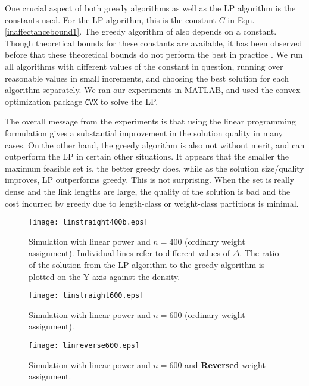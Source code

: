 \documentclass[11pt]{amsart}
\begin{document}
One crucial aspect of both greedy algorithms as well as the LP algorithm is the constants used. For the LP algorithm, this is the constant $C$ in Eqn. \ref{inaffectancebound1}. The greedy algorithm of \cite{SODA11} also depends on a constant.
Though theoretical bounds for these constants are available, it has been observed before that these theoretical
bounds do not perform the best in practice \cite{infocom11}. We run all algorithms with different values of the constant in question, running over reasonable values in small increments, and choosing the best solution for each algorithm separately.
We ran our experiments in MATLAB, and used the convex optimization package  \texttt{CVX} \cite{cvx} to solve the LP.

The overall message from the experiments is that using the linear
programming formulation gives a substantial improvement in the
solution quality in many cases. 
On the other hand, the greedy algorithm is also not without merit, and can outperform the LP in certain other situations.
It appears that the smaller the maximum feasible set is, the better
greedy does, while as the solution size/quality improves, LP
outperforms greedy. This is not surprising. When the set is really
dense and the link lengths are large, the quality of the solution is
bad and the cost incurred by greedy due to length-class or
weight-class partitions is minimal. 

\begin{figure}
\begin{center}
\texttt{[image: linstraight400b.eps]}
\caption{Simulation with linear power and $n = 400$ (ordinary weight assignment). Individual lines refer to different values of $\Delta$. The ratio of the solution from the LP algorithm to the greedy algorithm is plotted on the Y-axis against the density.} 
\label{fig:linstraight400}
\end{center}
\end{figure}

\begin{figure}
\begin{center}
\texttt{[image: linstraight600.eps]}
\caption{Simulation with linear power and $n = 600$ (ordinary weight assignment). } 
\label{fig:linstraight600}
\end{center}
\end{figure}

\begin{figure}
\begin{center}
\texttt{[image: linreverse600.eps]}
\caption{Simulation with linear power and $n = 600$ and {\bf Reversed} weight assignment. } 
\label{fig:linreverse600}
\end{center}
\end{figure}
\end{document}
